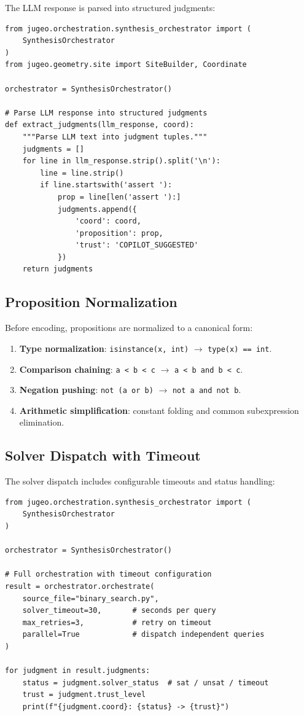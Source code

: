 \documentclass[11pt]{article}
\begin{document}
The LLM response is parsed into structured judgments:

\begin{lstlisting}[style=jugeo-python]
from jugeo.orchestration.synthesis_orchestrator import (
    SynthesisOrchestrator
)
from jugeo.geometry.site import SiteBuilder, Coordinate

orchestrator = SynthesisOrchestrator()

# Parse LLM response into structured judgments
def extract_judgments(llm_response, coord):
    """Parse LLM text into judgment tuples."""
    judgments = []
    for line in llm_response.strip().split('\n'):
        line = line.strip()
        if line.startswith('assert '):
            prop = line[len('assert '):]
            judgments.append({
                'coord': coord,
                'proposition': prop,
                'trust': 'COPILOT_SUGGESTED'
            })
    return judgments
\end{lstlisting}

\subsection{Proposition Normalization}

Before encoding, propositions are normalized to a canonical form:
\begin{enumerate}[noitemsep]
  \item \textbf{Type normalization}: \texttt{isinstance(x, int)}
        $\to$ \texttt{type(x) == int}.
  \item \textbf{Comparison chaining}: \texttt{a < b < c}
        $\to$ \texttt{a < b and b < c}.
  \item \textbf{Negation pushing}: \texttt{not (a or b)}
        $\to$ \texttt{not a and not b}.
  \item \textbf{Arithmetic simplification}: constant folding and
        common subexpression elimination.
\end{enumerate}

\subsection{Solver Dispatch with Timeout}

The solver dispatch includes configurable timeouts and status handling:

\begin{lstlisting}[style=jugeo-python]
from jugeo.orchestration.synthesis_orchestrator import (
    SynthesisOrchestrator
)

orchestrator = SynthesisOrchestrator()

# Full orchestration with timeout configuration
result = orchestrator.orchestrate(
    source_file="binary_search.py",
    solver_timeout=30,       # seconds per query
    max_retries=3,           # retry on timeout
    parallel=True            # dispatch independent queries
)

for judgment in result.judgments:
    status = judgment.solver_status  # sat / unsat / timeout
    trust = judgment.trust_level
    print(f"{judgment.coord}: {status} -> {trust}")
\end{lstlisting}
\end{document}

